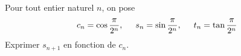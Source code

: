 Pour tout entier naturel $n$, on pose
\begin{displaymath}
  c_n = \cos\frac{\pi}{2^n},\hspace{0.5cm} s_n = \sin\frac{\pi}{2^n},\hspace{0.5cm} t_n = \tan\frac{\pi}{2^n}
\end{displaymath}
Exprimer $s_{n+1}$ en fonction de $c_n$.
\bigskip \bigskip